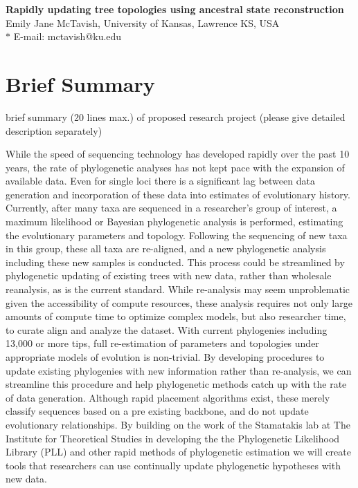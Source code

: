 \documentclass[10pt]{article}
\date{}
\begin{document}
\begin{flushleft}
{\Large
\textbf{Rapidly updating tree topologies using ancestral state reconstruction}
}
\\
Emily Jane McTavish, University of Kansas, Lawrence KS, USA
\\

$\ast$ E-mail: mctavish@ku.edu
\end{flushleft}

\section*{Brief Summary}

brief summary (20 lines max.) of proposed research project (please give detailed description separately)

While the speed of sequencing technology has developed rapidly over the past 10 years, the rate of phylogenetic analyses has not kept pace with the expansion of available data. 
Even for single loci there is a significant lag between data generation and incorporation of these data into estimates of evolutionary history. 
Currently, after many taxa are sequenced in a researcher's group of interest, a  maximum likelihood or Bayesian phylogenetic analysis is performed, estimating the evolutionary parameters and topology. 
Following the sequencing of new taxa in this group, these all taxa are re-aligned, and a new phylogenetic analysis including these new samples is conducted. 
This process could be streamlined by phylogenetic updating of existing trees with new data, rather than wholesale reanalysis, as is the current standard. 
While re-analysis may seem unproblematic given the accessibility of compute resources, these analysis requires not only large amounts of compute time to optimize complex models, but also researcher time, to curate align and analyze the dataset. 
With current phylogenies including 13,000 \cite{smith_rates_2008} or more tips, full re-estimation of parameters and topologies under appropriate models of evolution is non-trivial. 
 By developing procedures to update existing phylogenies with new information rather than re-analysis, we can streamline this procedure and help phylogenetic methods catch up with the rate of data generation. 
Although rapid placement algorithms exist, these merely classify sequences based on a pre existing backbone, and do not update evolutionary relationships. 
By building on the work of the Stamatakis lab at The Institute for Theoretical Studies in developing the the Phylogenetic Likelihood Library (PLL) and other rapid methods of phylogenetic estimation we will create tools that researchers can use continually update phylogenetic hypotheses with new data.
\end{document}
